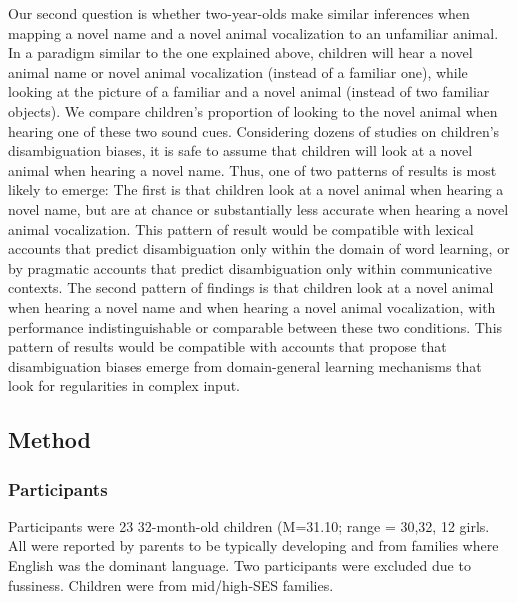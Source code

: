\documentclass[english,floatsintext,man]{apa6}
\theoremstyle{definition}
\theoremstyle{definition}
\theoremstyle{definition}
\theoremstyle{remark}
\begin{document}
Our second question is whether two-year-olds make similar inferences
when mapping a novel name and a novel animal vocalization to an
unfamiliar animal. In a paradigm similar to the one explained above,
children will hear a novel animal name or novel animal vocalization
(instead of a familiar one), while looking at the picture of a familiar
and a novel animal (instead of two familiar objects). We compare
children's proportion of looking to the novel animal when hearing one of
these two sound cues. Considering dozens of studies on children's
disambiguation biases, it is safe to assume that children will look at a
novel animal when hearing a novel name. Thus, one of two patterns of
results is most likely to emerge: The first is that children look at a
novel animal when hearing a novel name, but are at chance or
substantially less accurate when hearing a novel animal vocalization.
This pattern of result would be compatible with lexical accounts that
predict disambiguation only within the domain of word learning, or by
pragmatic accounts that predict disambiguation only within communicative
contexts. The second pattern of findings is that children look at a
novel animal when hearing a novel name and when hearing a novel animal
vocalization, with performance indistinguishable or comparable between
these two conditions. This pattern of results would be compatible with
accounts that propose that disambiguation biases emerge from
domain-general learning mechanisms that look for regularities in complex
input.

\subsection{Method}\label{method}

\subsubsection{Participants}\label{participants}

Participants were 23 32-month-old children (M=31.10; range = 30,32, 12
girls. All were reported by parents to be typically developing and from
families where English was the dominant language. Two participants were
excluded due to fussiness. Children were from mid/high-SES families.
\end{document}
